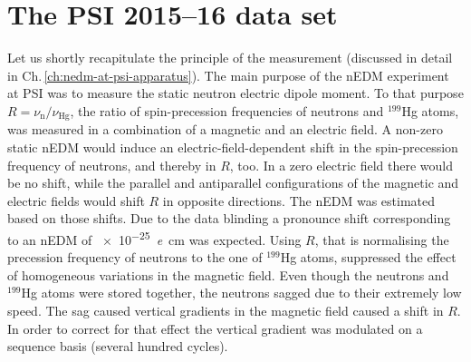 \section{The PSI 2015--16 data set}
Let us shortly recapitulate the principle of the measurement (discussed in detail in Ch.\,\ref{ch:nedm-at-psi-apparatus}). The main purpose of the nEDM experiment at PSI was to measure the static neutron electric dipole moment. To that purpose $R = \nu_\text{n} / \nu_\text{Hg}$, the ratio of spin-precession frequencies of neutrons and ${}^{199}$Hg atoms, was measured in a combination of a magnetic and an electric field. A non-zero static nEDM would induce an electric-field-dependent shift in the spin-precession frequency of neutrons, and thereby in $R$, too. In a zero electric field there would be no shift, while the parallel and antiparallel configurations of the magnetic and electric fields would shift $R$ in opposite directions.
The nEDM was estimated based on those shifts. Due to the data blinding
a pronounce shift corresponding to an nEDM of \SI{e-25}{\elementarycharge\centi\meter} was expected. Using $R$, that is normalising the precession frequency of neutrons to the one of ${}^{199}$Hg atoms, suppressed the effect of homogeneous variations in the magnetic field. Even though the neutrons and ${}^{199}$Hg atoms were stored together, the neutrons sagged due to their extremely low speed. The sag caused vertical gradients in the magnetic field caused a shift in $R$. In order to correct for that effect the vertical gradient was modulated on a sequence basis (several hundred cycles).

